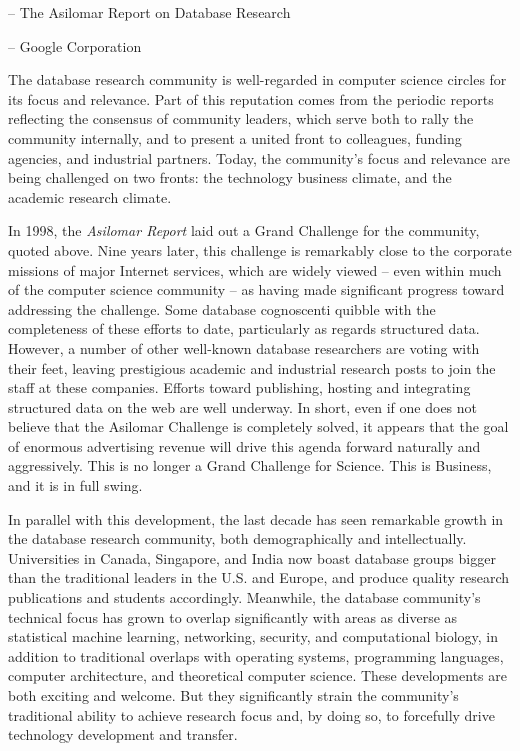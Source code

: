 \documentclass{acm_proc_article-sp}
\begin{document}
\vspace{-10pt}-- The Asilomar Report on Database Research


\vspace{-10pt} -- Google Corporation

The database research community is well-regarded in computer science circles for its focus and relevance. Part of this reputation comes from the periodic reports reflecting the consensus of community leaders, which serve both to rally the community internally, and to present a united front to colleagues, funding agencies, and industrial partners. Today, the community's focus and relevance are being challenged on two fronts: the technology business climate, and the academic research climate.

In 1998, the {\em Asilomar Report} laid out a Grand Challenge for the community, quoted above. Nine years later, this challenge is remarkably close to the corporate missions of major Internet services, which are widely viewed -- even within much of the computer science community -- as having made significant progress toward addressing the challenge. Some database cognoscenti quibble with the completeness of these efforts to date, particularly as regards structured data. However, a number of other well-known database researchers are voting with their feet, leaving prestigious academic and industrial research posts to join the staff at these companies. Efforts toward publishing, hosting and integrating structured data on the web are well underway. In short, even if one does not believe that the Asilomar Challenge is completely solved, it appears that the goal of enormous advertising revenue will drive this agenda forward naturally and aggressively. This is no longer a Grand Challenge for Science. This is Business, and it is in full swing.

In parallel with this development, the last decade has seen remarkable growth in the database research community, both demographically and intellectually. Universities in Canada, Singapore, and India now boast database groups bigger than the traditional leaders in the U.S. and Europe, and produce quality research publications and students accordingly. Meanwhile, the database community's technical focus has grown to overlap significantly with areas as diverse as statistical machine learning, networking, security, and computational biology, in addition to traditional overlaps with operating systems, programming languages, computer architecture, and theoretical computer science. These developments are both exciting and welcome. But they significantly strain the community's traditional ability to achieve research focus and, by doing so, to forcefully drive technology development and transfer.
\end{document}
